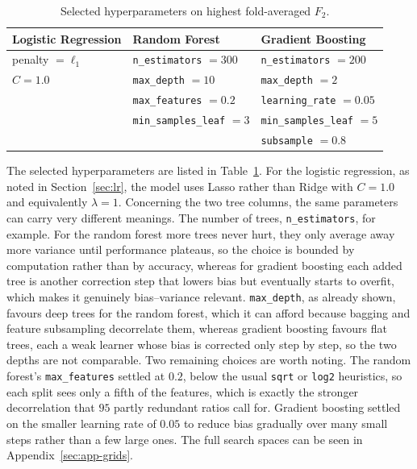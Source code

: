 \begin{table}[htbp]
  \centering
  \caption{Selected hyperparameters on highest fold-averaged $F_2$.}
  \label{tab:selected}
  \begin{tabular}{l|l|l}
    \toprule
    \textbf{Logistic Regression} & \textbf{Random Forest} & \textbf{Gradient Boosting} \\
    \midrule
    penalty $=\ell_1$ & \texttt{n\_estimators} $=300$    & \texttt{n\_estimators} $=200$    \\
    $C = 1.0$         & \texttt{max\_depth} $=10$        & \texttt{max\_depth} $=2$         \\
                      & \texttt{max\_features} $=0.2$    & \texttt{learning\_rate} $=0.05$  \\
                      & \texttt{min\_samples\_leaf} $=3$ & \texttt{min\_samples\_leaf} $=5$ \\
                      &                                  & \texttt{subsample} $=0.8$        \\
    \bottomrule
  \end{tabular}
\end{table}

The selected hyperparameters are listed in Table~\ref{tab:selected}. For the logistic
regression, as noted in Section~\ref{sec:lr}, the model uses Lasso rather than Ridge
with $C = 1.0$ and equivalently $\lambda = 1$. Concerning the two tree columns, the same
parameters can carry very different meanings. The number of trees,
\texttt{n\_estimators}, for example. For the random forest more trees never hurt,
they only average away more variance until performance plateaus, so the choice is
bounded by computation rather than by accuracy, whereas for gradient boosting each
added tree is another correction step that lowers bias but eventually starts to overfit, 
which makes it genuinely bias--variance relevant. \texttt{max\_depth}, as already
shown, favours deep trees for the random forest, which it
can afford because bagging and feature subsampling decorrelate them, whereas gradient
boosting favours flat trees, each a weak learner whose bias is corrected
only step by step, so the two depths are not comparable. Two remaining choices are
worth noting. The random forest's \texttt{max\_features} settled at $0.2$, below the
usual \texttt{sqrt} or \texttt{log2} heuristics, so each split sees only a fifth of
the features, which is exactly the stronger decorrelation that $95$ partly
redundant ratios call for. Gradient boosting settled on the smaller learning rate of
$0.05$ to reduce bias gradually over many small steps rather than a few large ones.
The full search spaces can be seen in Appendix~\ref{sec:app-grids}. 

